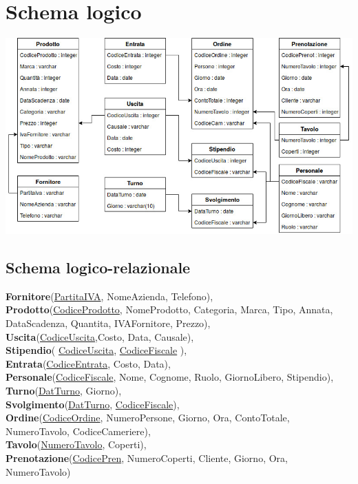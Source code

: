 \section{Schema logico}
\includegraphics[width=1\textwidth]{doc/schemaLogico}
\subsection{Schema logico-relazionale} %
\textbf{Fornitore}(\underline{PartitaIVA}, NomeAzienda, Telefono), \\ \smallskip
\textbf{Prodotto}(\underline{CodiceProdotto}, NomeProdotto, Categoria, Marca, Tipo, Annata, DataScadenza, Quantita, IVAFornitore, Prezzo), \\ \smallskip
\textbf{Uscita}(\underline{CodiceUscita},Costo, Data, Causale), \\ \smallskip
\textbf{Stipendio}( \underline{CodiceUscita}, \underline{CodiceFiscale} ), \\ \smallskip
\textbf{Entrata}(\underline{CodiceEntrata}, Costo, Data), \\ \smallskip
\textbf{Personale}(\underline{CodiceFiscale}, Nome, Cognome, Ruolo, GiornoLibero, Stipendio), \\ \smallskip
\textbf{Turno}(\underline{DatTurno}, Giorno), \\ \smallskip
\textbf{Svolgimento}(\underline{DatTurno}, \underline{CodiceFiscale}), \\ \smallskip
\textbf{Ordine}(\underline{CodiceOrdine}, NumeroPersone, Giorno, Ora, ContoTotale, NumeroTavolo, CodiceCameriere), \\ \smallskip 
\textbf{Tavolo}(\underline{NumeroTavolo}, Coperti), \\ \smallskip
\textbf{Prenotazione}(\underline{CodicePren}, NumeroCoperti, Cliente, Giorno, Ora, NumeroTavolo)\\

